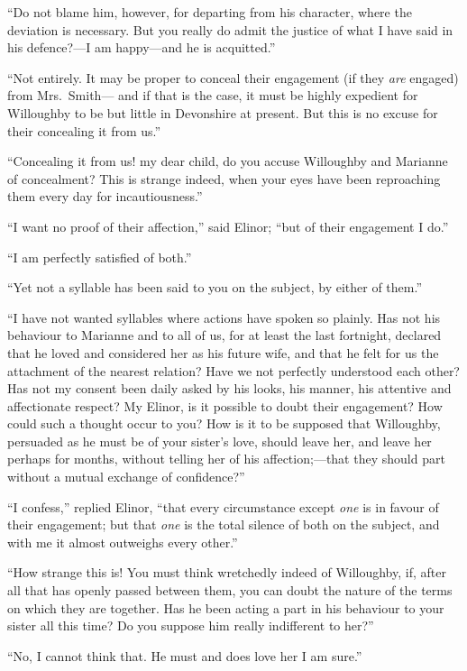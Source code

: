 \documentclass{article}
\begin{document}
``Do not blame him, however, for departing from
his character, where the deviation is necessary.
But you really do admit the justice of what I have said
in his defence?---I am happy---and he is acquitted.''

``Not entirely.  It may be proper to conceal their
engagement (if they \emph{are} engaged) from Mrs.\ Smith---%
and if that is the case, it must be highly expedient
for Willoughby to be but little in Devonshire at present.
But this is no excuse for their concealing it from us.''

``Concealing it from us! my dear child, do you accuse
Willoughby and Marianne of concealment? This is strange
indeed, when your eyes have been reproaching them every day
for incautiousness.''

``I want no proof of their affection,'' said Elinor;
``but of their engagement I do.''

``I am perfectly satisfied of both.''

``Yet not a syllable has been said to you on the
subject, by either of them.''

``I have not wanted syllables where actions have
spoken so plainly.  Has not his behaviour to Marianne
and to all of us, for at least the last fortnight,
declared that he loved and considered her as his future wife,
and that he felt for us the attachment of the nearest
relation?  Have we not perfectly understood each other?
Has not my consent been daily asked by his looks, his manner,
his attentive and affectionate respect?  My Elinor,
is it possible to doubt their engagement?  How could
such a thought occur to you?  How is it to be supposed
that Willoughby, persuaded as he must be of your
sister's love, should leave her, and leave her perhaps
for months, without telling her of his affection;---that
they should part without a mutual exchange of confidence?''

``I confess,'' replied Elinor, ``that every circumstance
except \emph{one} is in favour of their engagement;
but that \emph{one} is the total silence of both on the subject,
and with me it almost outweighs every other.''

``How strange this is!  You must think wretchedly indeed
of Willoughby, if, after all that has openly passed between them,
you can doubt the nature of the terms on which they are together.
Has he been acting a part in his behaviour to your sister
all this time?  Do you suppose him really indifferent to her?''

``No, I cannot think that.  He must and does love her
I am sure.''
\end{document}
